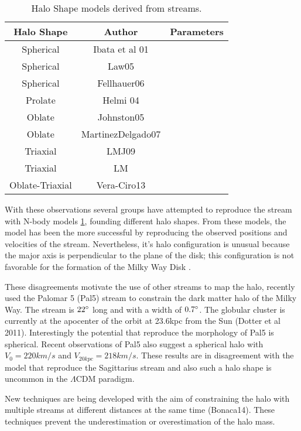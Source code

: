 \begin{table}
\begin{center}
\begin{tabular}{c c c}
\hline
\hline
Halo Shape & Author & Parameters \\
\hline
Spherical & Ibata et al 01 & \\
Spherical & Law05 & \\
Spherical & Fellhauer06 & \\
Prolate & Helmi 04 & \\
Oblate & Johnston05 & \\
Oblate & MartinezDelgado07 & \\
Triaxial & LMJ09 & \\
Triaxial & LM & \\
Oblate-Triaxial & Vera-Ciro13 & \\
\hline
\hline
\end{tabular}
\caption{Halo Shape models derived from streams.\label{tab:models}}
\end{center}
\end{table}


With these observations several groups have attempted to reproduce the
stream with N-body models \ref{tab:models}, founding different halo
shapes. From these models, the \citep{Law10} model has been
the more successful by reproducing the observed positions and velocities
of the stream. Nevertheless, it's halo configuration is unusual
because the major axis is perpendicular to the plane of the disk; this
configuration is not favorable for the formation of the
Milky Way Disk \citep{Debattista13}.

These disagreements motivate the use of other streams to map the halo,
recently \citep{Pearson15} used the Palomar 5 (Pal5) stream to constrain the dark
matter halo of the Milky Way. The stream is $22\degree$
long and with a width of $0.7 \degree$. The globular cluster is currently at the
apocenter of the orbit at 23.6kpc from the Sun (Dotter et al 2011). Interestingly
the potential that reproduce the morphology of Pal5 is spherical.
Recent observations of Pal5 \citep{Fritz15} also suggest a spherical
halo with $V_0 = 220 km/s$ and $V_{20kpc} = 218 km/s$. These results
are in disagreement with the \citep{Law10} model that reproduce the Sagittarius stream
and also such a halo shape is uncommon in the $\Lambda$CDM
paradigm. %

New techniques are being developed with the aim of constraining the halo with multiple
streams at different distances at the same time (Bonaca14). These techniques
prevent the underestimation or overestimation of the halo mass.

